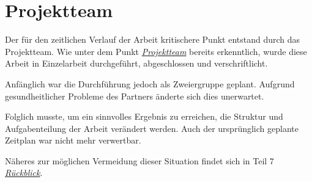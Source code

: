 \section{Projektteam}
\label{team}
Der für den zeitlichen Verlauf der Arbeit kritischere Punkt entstand durch das Projektteam.
Wie unter dem Punkt \hyperref[proteam]{\textit{Projektteam}} bereits erkenntlich, wurde diese Arbeit in Einzelarbeit durchgeführt, abgeschlossen und verschriftlicht.

Anfänglich war die Durchführung jedoch als Zweiergruppe geplant. 
Aufgrund gesundheitlicher Probleme des Partners änderte sich dies unerwartet.

Folglich musste, um ein sinnvolles Ergebnis zu erreichen, die Struktur und Aufgabenteilung der Arbeit verändert werden.
Auch der ursprünglich geplante Zeitplan war nicht mehr verwertbar.

Näheres zur möglichen Vermeidung dieser Situation findet sich in Teil 7 \hyperref[rueckblick]{\textit{Rückblick}}.
